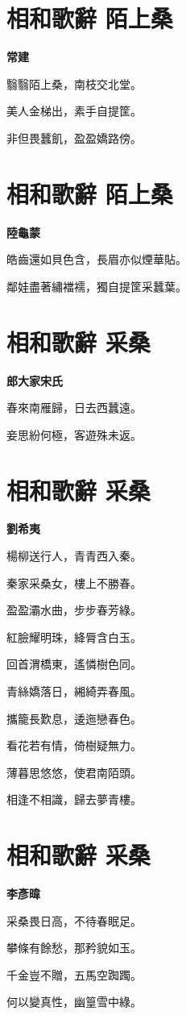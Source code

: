 \documentclass[12pt,a4paper]{ctexbook}
\begin{document}
\section{相和歌辭 陌上桑}
\textbf{常建}\par\vspace{0.5em}
翳翳陌上桑，南枝交北堂。\par
美人金梯出，素手自提筐。\par
非但畏蠶飢，盈盈嬌路傍。\par

\section{相和歌辭 陌上桑}
\textbf{陸龜蒙}\par\vspace{0.5em}
皓齒還如貝色含，長眉亦似煙華貼。\par
鄰娃盡著繡襠襦，獨自提筐采蠶葉。\par

\section{相和歌辭 采桑}
\textbf{郎大家宋氏}\par\vspace{0.5em}
春來南雁歸，日去西蠶遠。\par
妾思紛何極，客遊殊未返。\par

\section{相和歌辭 采桑}
\textbf{劉希夷}\par\vspace{0.5em}
楊柳送行人，青青西入秦。\par
秦家采桑女，樓上不勝春。\par
盈盈灞水曲，步步春芳綠。\par
紅臉耀明珠，絳脣含白玉。\par
回首渭橋東，遙憐樹色同。\par
青絲嬌落日，緗綺弄春風。\par
攜籠長歎息，逶迤戀春色。\par
看花若有情，倚樹疑無力。\par
薄暮思悠悠，使君南陌頭。\par
相逢不相識，歸去夢青樓。\par

\section{相和歌辭 采桑}
\textbf{李彥暐}\par\vspace{0.5em}
采桑畏日高，不待春眠足。\par
攀條有餘愁，那矜貌如玉。\par
千金豈不贈，五馬空踟躅。\par
何以變真性，幽篁雪中綠。\par
\end{document}
